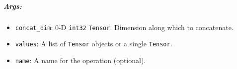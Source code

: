 \begin{Shaded}
\begin{Highlighting}[]
\OperatorTok{=} \NormalTok{[[}\NormalTok{, }\NormalTok{, }\NormalTok{], [}\NormalTok{, }\NormalTok{, }\NormalTok{]]}
\OperatorTok{=} \NormalTok{[[}\NormalTok{, }\NormalTok{, }\NormalTok{], [}\NormalTok{, }\NormalTok{, }\NormalTok{]]}
\NormalTok{, [t1, t2]) }\OperatorTok{==>} \NormalTok{[[}\NormalTok{, }\NormalTok{, }\NormalTok{], [}\NormalTok{, }\NormalTok{, }\NormalTok{], [}\NormalTok{, }\NormalTok{, }\NormalTok{], [}\NormalTok{, }\NormalTok{, }\NormalTok{]]}
\NormalTok{, [t1, t2]) }\OperatorTok{==>} \NormalTok{[[}\NormalTok{, }\NormalTok{, }\NormalTok{, }\NormalTok{, }\NormalTok{, }\NormalTok{], [}\NormalTok{, }\NormalTok{, }\NormalTok{, }\NormalTok{, }\NormalTok{, }\NormalTok{]]}

\NormalTok{, [t3, t4])) }\OperatorTok{==>} \NormalTok{[}\NormalTok{, }\NormalTok{]}
\NormalTok{, [t3, t4])) }\OperatorTok{==>} \NormalTok{[}\NormalTok{, }\NormalTok{]}
\end{Highlighting}
\end{Shaded}

\subparagraph{Args: }\label{args-17}

\begin{itemize}
\tightlist
\item
  \lstinline{concat_dim}: 0-D \lstinline{int32} \lstinline{Tensor}. Dimension
  along which to concatenate.
\item
  \lstinline{values}: A list of \lstinline{Tensor} objects or a single
  \lstinline{Tensor}.
\item
  \lstinline{name}: A name for the operation (optional).
\end{itemize}

